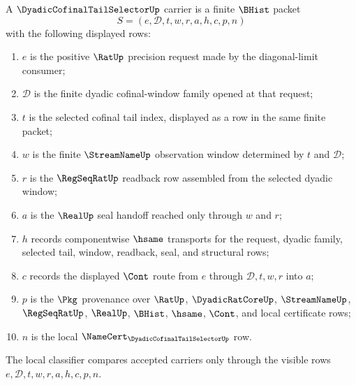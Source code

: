 \begin{definition}
\label{def:dyadic-cofinal-tail-selector-carrier}
A $\DyadicCofinalTailSelectorUp$ carrier is a finite $\BHist$ packet
$$
S=(e,\mathcal{D},t,w,r,a,h,c,p,n)
$$
with the following displayed rows:
\begin{enumerate}
\item $e$ is the positive $\RatUp$ precision request made by the diagonal-limit consumer;
\item $\mathcal{D}$ is the finite dyadic cofinal-window family opened at that request;
\item $t$ is the selected cofinal tail index, displayed as a row in the same finite packet;
\item $w$ is the finite $\StreamNameUp$ observation window determined by $t$ and $\mathcal{D}$;
\item $r$ is the $\RegSeqRatUp$ readback row assembled from the selected dyadic window;
\item $a$ is the $\RealUp$ seal handoff reached only through $w$ and $r$;
\item $h$ records componentwise $\hsame$ transports for the request, dyadic family, selected tail, window, readback, seal, and structural rows;
\item $c$ records the displayed $\Cont$ route from $e$ through $\mathcal{D},t,w,r$ into $a$;
\item $p$ is the $\Pkg$ provenance over $\RatUp$, $\DyadicRatCoreUp$, $\StreamNameUp$, $\RegSeqRatUp$, $\RealUp$, $\BHist$, $\hsame$, $\Cont$, and local certificate rows;
\item $n$ is the local $\NameCert_{\DyadicCofinalTailSelectorUp}$ row.
\end{enumerate}
The local classifier compares accepted carriers only through the visible rows $e,\mathcal{D},t,w,r,a,h,c,p,n$.
\end{definition}

